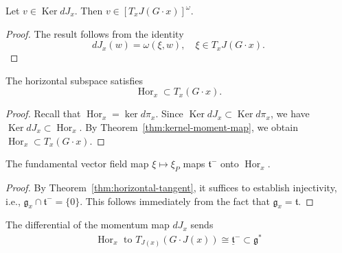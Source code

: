 \begin{theorem}\label{thm:kernel-moment-map}
Let $v \in \operatorname{Ker} dJ_{x}$. Then $v \in \left[ T_{x} J(G \cdot x) \right]^{\omega}$.
\end{theorem}

\begin{proof}
The result follows from the identity
\begin{equation}
dJ_{x}(w) = \omega(\xi, w), \quad \xi \in T_{x} J(G \cdot x). 
\end{equation}
\end{proof}

\begin{theorem}\label{thm:horizontal-tangent}
The horizontal subspace satisfies
\begin{equation}
\operatorname{Hor}_{x} \subset T_{x}(G \cdot x).
\end{equation}
\end{theorem}

\begin{proof}
Recall that $\operatorname{Hor}_{x} = \ker d\pi_{x}$. Since $\operatorname{Ker} dJ_{x} \subset \operatorname{Ker} d\pi_{x}$, we have $\operatorname{Ker} dJ_{x} \subset \operatorname{Hor}_{x}$. By Theorem~\ref{thm:kernel-moment-map}, we obtain $\operatorname{Hor}_{x} \subset T_{x}(G \cdot x)$.
\end{proof}

\begin{theorem}\label{thm:map-onto-horizontal}
The fundamental vector field map $\xi \mapsto \xi_{P}$ maps $\mathfrak{t}^{-}$ onto $\operatorname{Hor}_{x}$.
\end{theorem}

\begin{proof}
By Theorem~\ref{thm:horizontal-tangent}, it suffices to establish injectivity, i.e., $\mathfrak{g}_{x} \cap \mathfrak{t}^{-} = \{0\}$. This follows immediately from the fact that $\mathfrak{g}_{x} = \mathfrak{t}$.
\end{proof}

\begin{theorem}\label{thm:derivative-moment-map}
The differential of the momentum map $dJ_{x}$ sends 
\begin{align}
\operatorname{Hor}_{x} \text{ to } T_{J(x)}(G \cdot J(x)) \cong \underline{\mathfrak{t}}^{-} \subset \mathfrak{g}^{*}
\end{align}

\end{theorem}


